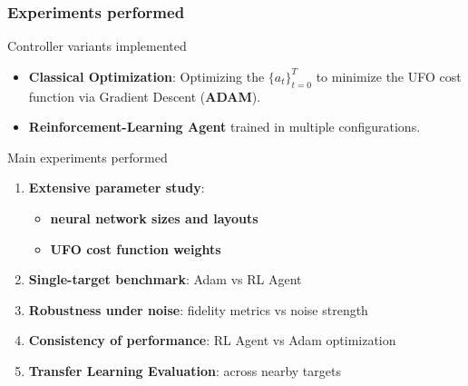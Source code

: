 \documentclass{beamer}
\begin{document}
\begin{frame}
    \frametitle{Experiments performed}
    \begin{alertblock}{Controller variants implemented}
    \begin{itemize}
        \item \textbf{Classical Optimization}: Optimizing the $\{a_t\}^T_{t=0}$ to minimize the UFO cost function via Gradient Descent (\textbf{ADAM}).
        \item \textbf{Reinforcement-Learning Agent} trained in multiple configurations.
    \end{itemize}
    \end{alertblock}

\begin{block}{Main experiments performed}

    \begin{enumerate}
        \item \textbf{Extensive parameter study}: 
        \begin{itemize}
            \item \textbf{neural network sizes and layouts} 
            \item \textbf{UFO cost function weights}
        \end{itemize}
        
        \item \textbf{Single-target benchmark}: Adam vs RL Agent
        \item \textbf{Robustness under noise}: fidelity metrics vs noise strength
    \end{enumerate}
    
    \begin{enumerate}
        \setcounter{enumi}{3}
        \item \textbf{Consistency of performance}: RL Agent vs Adam optimization
        \item \textbf{Transfer Learning Evaluation}: across nearby targets
    \end{enumerate}
\end{block}

\end{frame}
\end{document}
